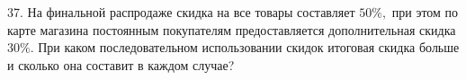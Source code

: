 37. На финальной распродаже скидка на все товары составляет $50\%,$ при этом по карте магазина постоянным покупателям предоставляется дополнительная скидка $30\%.$ При каком последовательном использовании скидок итоговая скидка больше и сколько она составит в каждом случае?\\
